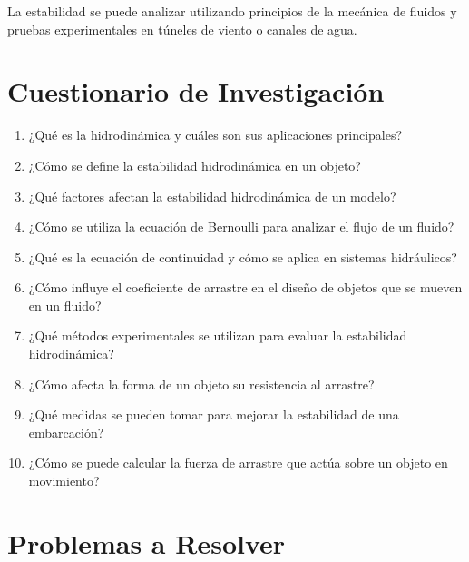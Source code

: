 \documentclass[../main]{subfiles}
\begin{document}
La estabilidad se puede analizar utilizando principios de la mecánica de fluidos y pruebas experimentales en túneles de viento o canales de agua.

\section{Cuestionario de Investigación}

\begin{enumerate}
    \item ¿Qué es la hidrodinámica y cuáles son sus aplicaciones principales?
    \item ¿Cómo se define la estabilidad hidrodinámica en un objeto?
    \item ¿Qué factores afectan la estabilidad hidrodinámica de un modelo?
    \item ¿Cómo se utiliza la ecuación de Bernoulli para analizar el flujo de un fluido?
    \item ¿Qué es la ecuación de continuidad y cómo se aplica en sistemas hidráulicos?
    \item ¿Cómo influye el coeficiente de arrastre en el diseño de objetos que se mueven en un fluido?
    \item ¿Qué métodos experimentales se utilizan para evaluar la estabilidad hidrodinámica?
    \item ¿Cómo afecta la forma de un objeto su resistencia al arrastre?
    \item ¿Qué medidas se pueden tomar para mejorar la estabilidad de una embarcación?
    \item ¿Cómo se puede calcular la fuerza de arrastre que actúa sobre un objeto en movimiento?

\end{enumerate}

\section{Problemas a Resolver}
\end{document}
